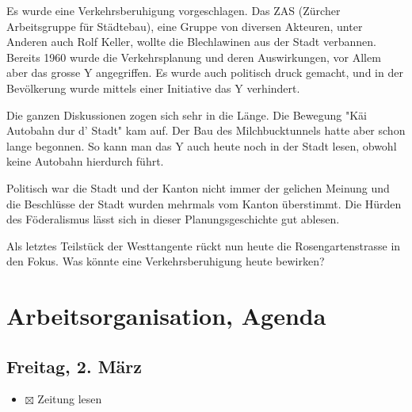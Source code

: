 \documentclass[a4paper,11pt,ngerman]{scrartcl}
\begin{document}
Es wurde eine Verkehrsberuhigung vorgeschlagen. Das ZAS (Zürcher
Arbeitsgruppe für Städtebau), eine Gruppe von diversen Akteuren, unter
Anderen auch Rolf Keller, wollte die Blechlawinen aus der Stadt
verbannen. Bereits 1960 wurde die Verkehrsplanung und deren Auswirkungen,
vor Allem aber das grosse Y angegriffen. Es wurde auch politisch druck
gemacht, und in der Bevölkerung wurde mittels einer Initiative das Y
verhindert.

Die ganzen Diskussionen zogen sich sehr in die Länge. Die Bewegung "Käi
Autobahn dur d' Stadt" kam auf. Der Bau des Milchbucktunnels hatte aber
schon lange begonnen. So kann man das Y auch heute noch in der Stadt lesen,
obwohl keine Autobahn hierdurch führt.

Politisch war die Stadt und der Kanton nicht immer der gelichen Meinung und
die Beschlüsse der Stadt wurden mehrmals vom Kanton überstimmt. Die Hürden
des Föderalismus lässt sich in dieser Planungsgeschichte gut ablesen.

Als letztes Teilstück der Westtangente rückt nun heute die
Rosengartenstrasse in den Fokus. Was könnte eine Verkehrsberuhigung heute
bewirken?

\section{Arbeitsorganisation, Agenda}
\label{sec-3}

\subsection{Freitag, 2. März}
\label{sec-3-1}

\begin{itemize}
\item $\boxtimes$ Zeitung lesen
\end{itemize}
\end{document}
